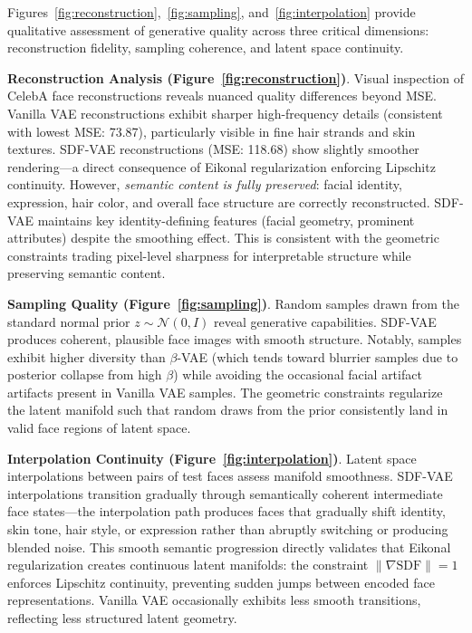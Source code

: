 \documentclass[10pt,twocolumn,letterpaper]{article}
\begin{document}
Figures~\ref{fig:reconstruction},~\ref{fig:sampling}, and~\ref{fig:interpolation} provide qualitative assessment of generative quality across three critical dimensions: reconstruction fidelity, sampling coherence, and latent space continuity.

\textbf{Reconstruction Analysis (Figure~\ref{fig:reconstruction})}. Visual inspection of CelebA face reconstructions reveals nuanced quality differences beyond MSE. Vanilla VAE reconstructions exhibit sharper high-frequency details (consistent with lowest MSE: 73.87), particularly visible in fine hair strands and skin textures. SDF-VAE reconstructions (MSE: 118.68) show slightly smoother rendering---a direct consequence of Eikonal regularization enforcing Lipschitz continuity. However, \textit{semantic content is fully preserved}: facial identity, expression, hair color, and overall face structure are correctly reconstructed. SDF-VAE maintains key identity-defining features (facial geometry, prominent attributes) despite the smoothing effect. This is consistent with the geometric constraints trading pixel-level sharpness for interpretable structure while preserving semantic content.

\textbf{Sampling Quality (Figure~\ref{fig:sampling})}. Random samples drawn from the standard normal prior $z \sim \mathcal{N}(0, I)$ reveal generative capabilities. SDF-VAE produces coherent, plausible face images with smooth structure. Notably, samples exhibit higher diversity than $\beta$-VAE (which tends toward blurrier samples due to posterior collapse from high $\beta$) while avoiding the occasional facial artifact artifacts present in Vanilla VAE samples. The geometric constraints regularize the latent manifold such that random draws from the prior consistently land in valid face regions of latent space.

\textbf{Interpolation Continuity (Figure~\ref{fig:interpolation})}. Latent space interpolations between pairs of test faces assess manifold smoothness. SDF-VAE interpolations transition gradually through semantically coherent intermediate face states---the interpolation path produces faces that gradually shift identity, skin tone, hair style, or expression rather than abruptly switching or producing blended noise. This smooth semantic progression directly validates that Eikonal regularization creates continuous latent manifolds: the constraint $\|\nabla \text{SDF}\| = 1$ enforces Lipschitz continuity, preventing sudden jumps between encoded face representations. Vanilla VAE occasionally exhibits less smooth transitions, reflecting less structured latent geometry.
\end{document}
